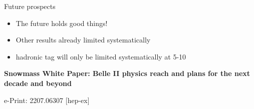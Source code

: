 \documentclass[xcolor=dvipsnames]{beamer}
\begin{document}
   \begin{frame}{Future prospects}
      \scriptsize\centering
         \begin{itemize}
            \item The future holds good things!
            \item Other results already limited systematically
            \item[\ra] hadronic tag will only be limited systematically at 5-10~\invab
         \end{itemize}
      
      
      
      \begin{flushright}
         \textbf{Snowmass White Paper: Belle II physics reach and plans for the next decade and beyond}
      
      e-Print: 2207.06307 [hep-ex]
      \end{flushright}
      \end{frame}
\end{document}

